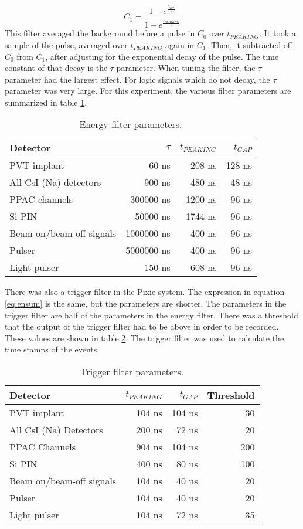 \documentclass[../MaxHughesThesis.tex]{subfiles}
\begin{document}
\begin{equation}
	C_{1} = \frac{1 - e^{\frac{t_{SPL}}{\tau}}}{1 - e^{\frac{t_{PEAKING}}{\tau}}}
	\label{eq:c1sum}
\end{equation}
%
This filter averaged the background before a pulse in $C_{0}$ over $t_{PEAKING}$.
It took a sample of the pulse, averaged over $t_{PEAKING}$ again in $C_{1}$.
Then, it subtracted off $C_{0}$ from $C_{1}$, after adjusting for the exponential decay of the pulse.
The time constant of that decay is the $\tau$ parameter.
When tuning the filter, the $\tau$ parameter had the largest effect.
For logic signals which do not decay, the $\tau$ parameter was very large.
For this experiment, the various filter parameters are summarized in table \ref{tab:pixieparams}.  
%
\begin{table}[!hbt]
	\centering
	\caption{Energy filter parameters.}
		\begin{tabular}{lrrr}
			Detector & $\tau$ & $t_{PEAKING}$ & $t_{GAP}$ \\ \hline
			PVT implant & 60 ns & 208 ns & 128 ns \\
			All CsI (Na) detectors & 900 ns & 480 ns & 48 ns \\
			PPAC channels & 300000 ns & 1200 ns & 96 ns \\ 
			Si PIN & 50000 ns & 1744 ns & 96 ns \\
			Beam-on/beam-off signals & 1000000 ns & 400 ns & 96 ns \\
			Pulser & 5000000 ns & 400 ns & 96 ns \\
			Light pulser & 150 ns & 608 ns & 96 ns 
		\end{tabular}	
		\label{tab:pixieparams}
\end{table}
%
There was also a trigger filter in the Pixie system.
The expression in equation \ref{eq:ensum} is the same, but the parameters are shorter.
The parameters in the trigger filter are half of the parameters in the energy filter.
There was a threshold that the output of the trigger filter had to be above in order to be recorded.
These values are shown in table \ref{tab:trigfilter}.
The trigger filter was used to calculate the time stamps of the events.  
%
\begin{table}[!hbt]
	\centering
	\caption{Trigger filter parameters.}
		\begin{tabular}{lrrr}
			Detector & $t_{PEAKING}$ & $t_{GAP}$ & Threshold\\ \hline
			PVT implant & 104 ns & 104 ns & 30 \\ 
			All CsI (Na) Detectors & 200 ns & 72 ns & 20 \\
			PPAC Channels & 904 ns & 104 ns & 200 \\ 
			Si PIN & 400 ns & 80 ns & 100 \\
			Beam on/beam-off signals & 104 ns & 40 ns & 20 \\
			Pulser & 104 ns & 40 ns & 20 \\
			Light pulser & 104 ns & 72 ns & 35
		\end{tabular}	
		\label{tab:trigfilter}
\end{table}
%
\end{document}
